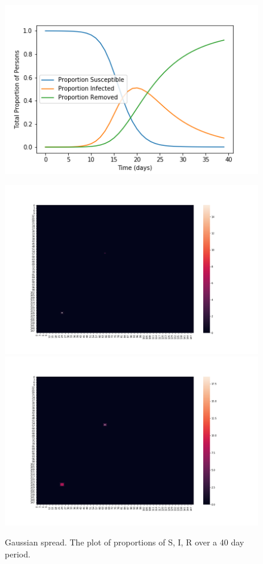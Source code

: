 \documentclass[a4paper]{article}
\begin{document}
\begin{figure}[ht]
  \includegraphics[scale=0.75]{../gaussian_spread/gauss_plot.png}
  \centering
  \caption{Gaussian spread. The plot of proportions of S, I, R over a 40 day
  period.}
  \includegraphics[scale=0.15]{../no_quarantine/no_quarantine_heatmap_0.png}
  \centering
  \includegraphics[scale=0.15]{../no_quarantine/no_quarantine_heatmap_1.png}

\end{figure}
\end{document}

